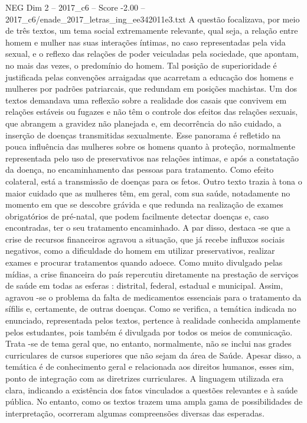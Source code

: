 \begin{textsample}{NEG Dim 2 – 2017\_c6 – Score -2.00 – 2017\_c6/enade\_2017\_letras\_ing\_ee342011e3.txt}
A questão focalizava, por meio de três textos, um tema social extremamente relevante, qual seja, a relação entre homem e mulher nas suas interações íntimas, no caso representadas pela vida sexual, e o reflexo das relações de poder veiculadas pela sociedade, que apontam, no mais das vezes, o predomínio do homem.
Tal posição de superioridade é justificada pelas convenções arraigadas que acarretam a educação dos homens e mulheres por padrões patriarcais, que redundam em posições machistas.
Um dos textos demandava uma reflexão sobre a realidade dos casais que convivem em relações estáveis ou fugazes e não têm o controle dos efeitos das relações sexuais, que abrangem a gravidez não planejada e, em decorrência do não cuidado, a inserção de doenças transmitidas sexualmente.
Esse panorama é refletido na pouca influência das mulheres sobre os homens quanto à proteção, normalmente representada pelo uso de preservativos nas relações intimas, e após a constatação da doença, no encaminhamento das pessoas para tratamento.
Como efeito colateral, está a transmissão de doenças para os fetos.
Outro texto trazia à tona o maior cuidado que as mulheres têm, em geral, com sua saúde, notadamente no momento em que se descobre grávida e que redunda na realização de exames obrigatórios de pré-natal, que podem facilmente detectar doenças e, caso encontradas, ter o seu tratamento encaminhado.
A par disso, destaca -se que a crise de recursos financeiros agravou a situação, que já recebe influxos sociais negativos, como a dificuldade do homem em utilizar preservativos, realizar exames e procurar tratamentos quando adoece.
Como muito divulgado pelas mídias, a crise financeira do país repercutiu diretamente na prestação de serviços de saúde em todas as esferas : distrital, federal, estadual e municipal.
Assim, agravou -se o problema da falta de medicamentos essenciais para o tratamento da sífilis e, certamente, de outras doenças.
Como se verifica, a temática indicada no enunciado, representada pelos textos, pertence à realidade conhecida amplamente pelos estudantes, pois também é divulgada por todos os meios de comunicação.
Trata -se de tema geral que, no entanto, normalmente, não se inclui nas grades curriculares de cursos superiores que não sejam da área de Saúde.
Apesar disso, a temática é de conhecimento geral e relacionada aos direitos humanos, esses sim, ponto de integração com as diretrizes curriculares.
A linguagem utilizada era clara, indicando a existência dos fatos vinculados a questões relevantes e à saúde pública.
No entanto, como os textos trazem uma ampla gama de possibilidades de interpretação, ocorreram algumas compreensões diversas das esperadas.

\end{textsample}
